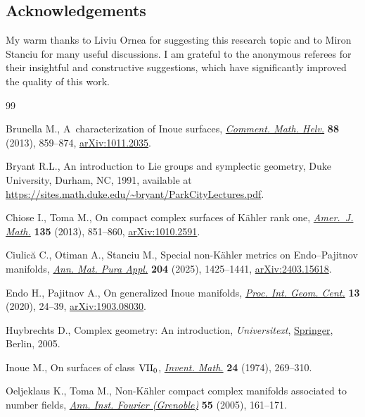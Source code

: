 \documentclass[10pt,a4paper]{amsart}
\newcommand{\6}{\partial}
\numberwithin{equation}{section}
\begin{document}
\subsection*{Acknowledgements}
My warm thanks to Liviu Ornea for suggesting this research topic and to Miron Stanciu for many useful discussions. I am grateful to the anonymous referees for their insightful and constructive suggestions, which have significantly improved the quality of this work.


\begin{thebibliography}{99}
\footnotesize\itemsep=0pt

Brunella M., A~characterization of {I}noue surfaces,
 \href{https://doi.org/10.4171/CMH/305}{\textit{Comment. Math. Helv.}}
 \textbf{88} (2013), 859--874,
 \href{http://arxiv.org/abs/1011.2035}{arXiv:1011.2035}.

Bryant R.L., An introduction to Lie groups and symplectic geometry, Duke
 University, Durham, NC, 1991, available at
 \url{https://sites.math.duke.edu/~bryant/ParkCityLectures.pdf}.

Chiose I., Toma M., On compact complex surfaces of {K}\"ahler rank one,
 \href{https://doi.org/10.1353/ajm.2013.0022}{\textit{Amer.~J. Math.}}
 \textbf{135} (2013), 851--860,
 \href{http://arxiv.org/abs/1010.2591}{arXiv:1010.2591}.

Ciulic\u{a} C., Otiman A., Stanciu M., Special non-{K}\"ahler metrics on
 {E}ndo--{P}ajitnov manifolds,
 \href{https://doi.org/10.1007/s10231-024-01533-0}{\textit{Ann. Mat. Pura
 Appl.}} \textbf{204} (2025), 1425--1441,
 \href{http://arxiv.org/abs/2403.15618}{arXiv:2403.15618}.

Endo H., Pajitnov A., On generalized {I}noue manifolds,
 \href{https://doi.org/10.15673/tmgc.v13i4.1748}{\textit{Proc. Int. Geom.
 Cent.}} \textbf{13} (2020), 24--39,
 \href{http://arxiv.org/abs/1903.08030}{arXiv:1903.08030}.

Huybrechts D., Complex geometry: {A}n introduction, \textit{Universitext},
 \href{https://doi.org/10.1007/b137952}{Springer}, Berlin, 2005.

Inoue M., On surfaces of class {${\rm VII}_{0}$},
 \href{https://doi.org/10.1007/BF01425563}{\textit{Invent. Math.}} \textbf{24}
 (1974), 269--310.

Oeljeklaus K., Toma M., Non-{K}\"ahler compact complex manifolds associated to
 number fields, \href{https://doi.org/10.5802/aif.2093}{\textit{Ann. Inst.
 Fourier (Grenoble)}} \textbf{55} (2005), 161--171.


\end{thebibliography}
\end{document}
